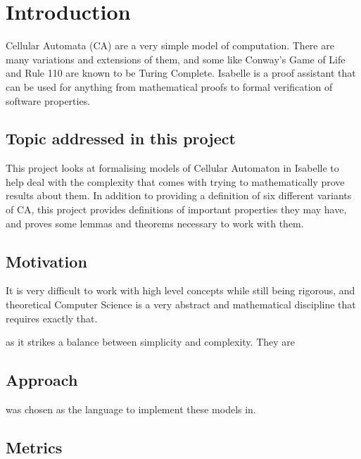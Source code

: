 \chapter{Introduction}
Cellular Automata (CA) are a very simple model of computation.
There are many variations and extensions of them,
and some like Conway's Game of Life and Rule 110 are known to be Turing Complete.
Isabelle is a proof assistant that can be used for anything from mathematical proofs to formal verification of software properties.

\section{Topic addressed in this project}

This project looks at formalising models of Cellular Automaton in Isabelle to help deal with the complexity that comes with trying to mathematically prove results about them.
In addition to providing a definition of six different variants of CA,
this project provides definitions of important properties they may have, and proves some lemmas and theorems necessary to work with them.

\section{Motivation}

It is very difficult to work with high level concepts while still being rigorous,
and theoretical Computer Science is a very abstract and mathematical discipline that requires exactly that.

as it strikes a balance between simplicity and complexity.
They are


\section{Approach}

 was chosen as the language to implement these models in.

\section{Metrics}






%
